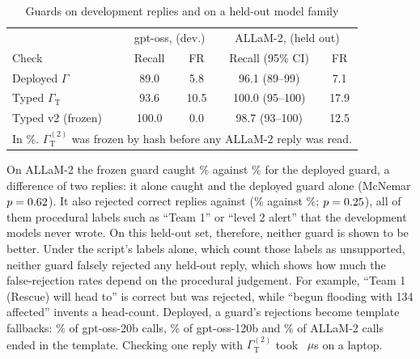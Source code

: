\documentclass[conference]{IEEEtran}
\begin{document}
\begin{table}[t]
\caption{Guards on development replies and on a held-out model family}
\label{tab:heldout}
\centering
\footnotesize
\setlength{\tabcolsep}{2.6pt}
\begin{tabular}{lcccc}
\toprule
 & \multicolumn{2}{c}{gpt-oss, \LiveN{} (dev.)} & \multicolumn{2}{c}{ALLaM-2, \HoN{} (held out)}\\
Check & Recall & FR & Recall (95\% CI) & FR\\
\midrule
Deployed $\Gamma$ & 89.0 & 5.8 & 96.1 (89--99) & 7.1\\
Typed $\Gamma_{\mathrm{T}}$ & 93.6 & 10.5 & 100.0 (95--100) & 17.9\\
Typed v2 (frozen) & 100.0 & 0.0 & 98.7 (93--100) & 12.5\\
\bottomrule
\multicolumn{5}{l}{\scriptsize In \%. $\Gamma_{\mathrm{T}}^{(2)}$ was frozen by hash before any ALLaM-2 reply was read.}\\
\end{tabular}
\end{table}

On ALLaM-2 the frozen guard caught \HoVtwoRec\% against \HoDepRec\% for the deployed guard, a difference of two replies: it alone caught \McVtwoRecOnly{} and the deployed guard alone \McDepRecOnly{} (McNemar $p=0.62$). It also rejected \HoVtwoFp{} correct replies against \HoDepFp{} (\HoVtwoFpr\% against \HoDepFpr\%; $p=0.25$), all of them procedural labels such as ``Team 1'' or ``level 2 alert'' that the development models never wrote. On this held-out set, therefore, neither guard is shown to be better. Under the script's labels alone, which count those labels as unsupported, neither guard falsely rejected any held-out reply, which shows how much the false-rejection rates depend on the procedural judgement. For example, ``Team 1 (Rescue) will head to'' is correct but was rejected, while ``begun flooding with 134 affected'' invents a head-count. Deployed, a guard's rejections become template fallbacks: \FbTwenty\% of gpt-oss-20b calls, \FbOneTwenty\% of gpt-oss-120b and \FbAllam\% of ALLaM-2 calls ended in the template. Checking one reply with $\Gamma_{\mathrm{T}}^{(2)}$ took \VtwoUs~$\mu$s on a laptop.
\end{document}
